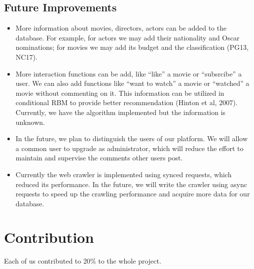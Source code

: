 \begin{CJK*}{UTF8}{gbsn}
\subsection{Future Improvements}
\begin{itemize}
\item More information about movies, directors, actors can be added to the database. For example, for actors we may add their nationality and Oscar nominations; for movies we may add its budget and the classification (PG13, NC17).
\item More interaction functions can be add, like ``like'' a movie or ``subsrcibe'' a user. We can also add functions like ``want to watch'' a movie or ``watched'' a movie without commenting on it. This information can be utilized in conditional RBM to provide better recommendation (Hinton et al, 2007). Currently, we have the algorithm implemented but the information is unknown. 
\item In the future, we plan to distinguish the users of our platform. We will allow a common user to upgrade as administrator, which will reduce the effort to maintain and supervise the comments other users post.
\item Currently the web crawler is implemented using synced requests, which reduced its performance. In the future, we will write the crawler using async requests to speed up the crawling performance and acquire more data for our database.
\end{itemize}

\section{Contribution}
Each of us contributed to 20\% to the whole project.

\end{CJK*}

